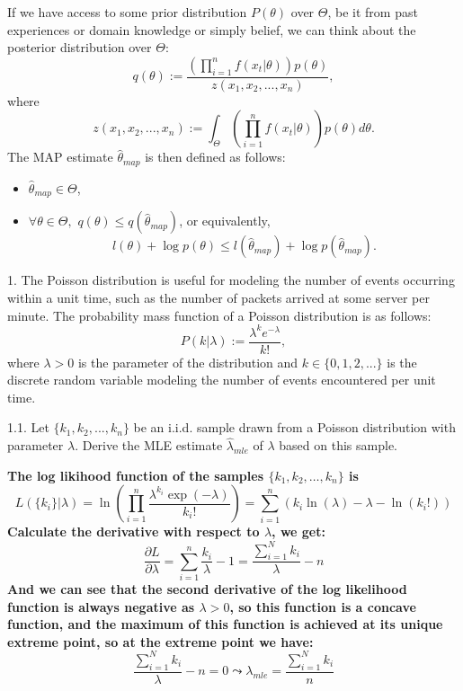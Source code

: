 \documentclass{article}
\theoremstyle{definition}
\theoremstyle{definition}
\theoremstyle{remark}
\begin{document}
If we have access to some prior distribution $P(\theta)$ over $\Theta$, be it from past experiences or domain knowledge
or simply belief, we can think about the posterior distribution over $\Theta$:
\begin{equation}
q(\theta):=\frac{\left(\prod_{i=1}^nf(x_t|\theta)\right)p(\theta)}{z(x_1,x_2,...,x_n)},
\end{equation}
where
\begin{equation}
z(x_1,x_2,...,x_n):=\int_\Theta \left(\prod_{i=1}^nf(x_t|\theta)\right)p(\theta) d\theta.
\end{equation}
The MAP estimate $\hat{\theta}_{map}$ is then defined as follows:
\begin{itemize}
  \item $\hat{\theta}_{map}\in \Theta$,
  \item $\forall \theta \in \Theta,$ $q(\theta)\leq q(\hat{\theta}_{map})$, or equivalently,
  \begin{equation}
  l(\theta)+\log p(\theta) \leq l(\hat{\theta}_{map}) + \log p(\hat{\theta}_{map}).
  \end{equation}
\end{itemize}

1. The Poisson distribution is useful for modeling the number of events occurring within a unit time, such
as the number of packets arrived at some server per minute. The probability mass function of a Poisson
distribution is as follows:
\begin{equation}
P(k|\lambda):= \frac{\lambda^k e^{-\lambda}}{k!},
\end{equation}
where $\lambda > 0$ is the parameter of the distribution and $k\in\{0,1,2,...\}$ is the discrete random variable modeling
the number of events encountered per unit time.

1.1. Let $\{k_1,k_2,...,k_n\}$ be an i.i.d. sample drawn from a Poisson distribution with parameter $\lambda$. Derive the MLE estimate $\hat{\lambda}_{mle}$
of $\lambda$ based on this sample.

\begin{addmargin}[3em]{2em}
\textbf{The log likihood function of the samples $\{k_1, k_2, \dots, k_n\}$ is}
\[
L(\{k_i\} | \lambda) = \ln(\prod_{i=1}^n \frac{\lambda^{k_i} \exp(-\lambda)}{k_i!}) = \sum_{i=1}^n (k_i \ln(\lambda) - \lambda - \ln(k_i!))
\]
\textbf{Calculate the derivative with respect to $\lambda$, we get:}
\[
\frac{\partial L}{\partial \lambda} = \sum_{i=1}^n \frac{k_i}{\lambda} - 1 = \frac{\sum_{i=1}^N k_i}{\lambda} - n
\]
\textbf{And we can see that the second derivative of the log likelihood function is always negative as $\lambda > 0$, so this function is a concave function, and the maximum of this function is achieved at its unique extreme point, so at the extreme point we have:}
\[
\frac{\sum_{i=1}^N k_i}{\lambda} - n = 0 \leadsto \lambda_{mle} = \frac{\sum_{i=1}^N k_i}{n}
\]
\end{addmargin}
\end{document}
